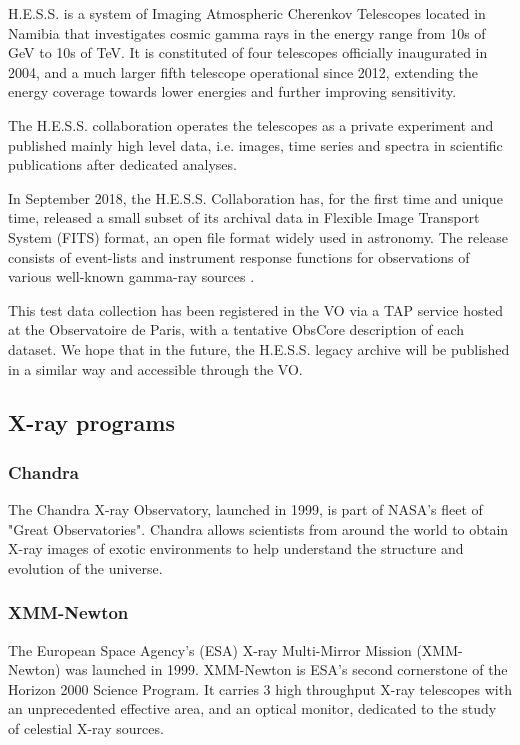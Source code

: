 \documentclass[11pt,a4paper]{ivoa}
\begin{document}
H.E.S.S. is a system of Imaging Atmospheric Cherenkov Telescopes located in Namibia that investigates cosmic gamma rays in the energy range from 10s of GeV to 10s of TeV. It is constituted of four telescopes officially inaugurated in 2004, and a much larger fifth telescope operational since 2012, extending the energy coverage towards lower energies and further improving sensitivity.

The H.E.S.S. collaboration operates the telescopes as a private experiment and published mainly high level data, i.e. images, time series and spectra in scientific publications after dedicated analyses.

In September 2018, the H.E.S.S. Collaboration has, for the first time and unique time, released a small subset of its archival data in Flexible Image Transport System (FITS) format, an open file format widely used in astronomy. The release consists of event-lists and instrument response functions for observations of various well-known gamma-ray sources
\citep{hess-zenodo.1421098}.

This test data collection has been registered in the VO via a TAP service hosted at the Observatoire de Paris, with a tentative ObsCore description of each dataset. We hope that in the future, the H.E.S.S. legacy archive will be published in a similar way and accessible through the VO.



\subsection{X-ray programs}

\subsubsection{Chandra}

The Chandra X-ray Observatory, launched in 1999, is part of NASA's ﬂeet of "Great Observatories". Chandra allows scientists from around the world to obtain X-ray images of exotic environments to help understand the structure and evolution of the universe.



\subsubsection{XMM-Newton}

The European Space Agency's (ESA) X-ray Multi-Mirror Mission (XMM-Newton) was launched in 1999. XMM-Newton is ESA's second cornerstone of the Horizon 2000 Science Program. It carries 3 high throughput X-ray telescopes with an unprecedented effective area, and an optical monitor, dedicated to the study of celestial X-ray sources.
\end{document}
